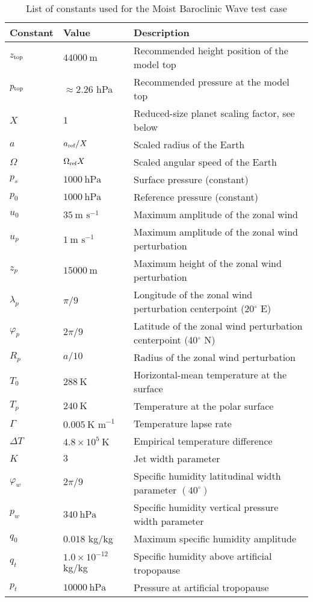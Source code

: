 \documentclass[times,doublespace]{fldauth}
\begin{document}
\begin{table}[h]

\caption{List of constants used for the Moist Baroclinic Wave test case}
\label{test4:tab}
\begin{tabular*}{\textwidth}{@{\extracolsep{\fill}}lll}
\hline Constant & Value & Description \\
\hline 
$z_{\tiny \mbox{top}}$ & $44000\ \mbox{m}$ & Recommended height position of the model top \\
$p_{\tiny \mbox{top}}$ & $\approx 2.26$ hPa & Recommended pressure at the model top\\
$X$ & $1$ & Reduced-size planet scaling factor, see below\\
$a$ & $a_{\tiny \mbox{ref}}/X$ & Scaled radius of the Earth \\
$\Omega$ & $\Omega_{\tiny \mbox{ref}}X$ & Scaled angular speed of the Earth \\
$p_s$ & $1000\ \mbox{hPa}$ & Surface pressure (constant) \\
$p_0$ & $1000\ \mbox{hPa}$ & Reference pressure (constant) \\
$u_0$ & $35\ \mbox{m\ s}^{-1}$ & Maximum amplitude of the zonal wind \\
$u_p$ & $1\ \mbox{m\ s}^{-1}$ & Maximum amplitude of the zonal wind perturbation \\
$z_p$ & $15000\ \mbox{m}$ & Maximum height of the zonal wind perturbation \\
$\lambda_p$ & $\pi / 9$ & Longitude of the zonal wind perturbation centerpoint (20$^\circ$ E)\\
$\varphi_p$ & $2 \pi / 9$ & Latitude of the zonal wind perturbation centerpoint (40$^\circ$ N)\\
$R_p$ & $a / 10$ & Radius of the zonal wind perturbation \\
$T_0$ & $288\ \mbox{K}$ & Horizontal-mean temperature at the surface \\
$T_p$ & $240 \ \mbox{K}$ & Temperature at the polar surface\\
$\Gamma$ & $0.005\ \mbox{K\ m}^{-1}$ & Temperature lapse rate \\
$\Delta T$ & $4.8 \times 10^{5}\ \mbox{K}$ & Empirical temperature difference \\
$K$ & $3$ & Jet width parameter \\
$\varphi_w$ & $2 \pi / 9$ & Specific humidity latitudinal width parameter $(40^\circ)$\\
$p_w$ & $340\ \mbox{hPa}$ & Specific humidity vertical pressure width parameter \\
$q_0$ & $0.018$ kg/kg& Maximum specific humidity amplitude \\
$q_t$ & $1.0 \times 10^{-12}$ kg/kg & Specific humidity above artificial tropopause \\
$p_t$ & $10000\ \mbox{hPa}$ & Pressure at artificial tropopause \\  
\hline 
\end{tabular*}


\end{table}
\end{document}
